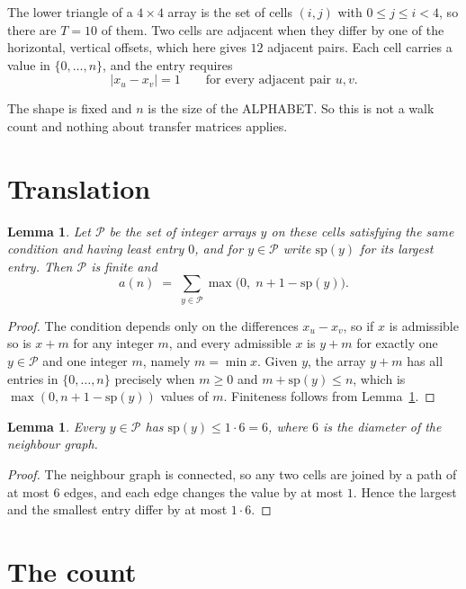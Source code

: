 \documentclass[11pt,a4paper]{article}
\theoremstyle{plain}
\newtheorem{lemma}[theorem]{Lemma}
\theoremstyle{definition}
\begin{document}
The lower triangle of a $4\times4$ array is the set of cells $(i,j)$ with $0\le j\le
i<4$, so there are $T=10$ of them. Two cells are adjacent when they differ by one of the
horizontal, vertical offsets, which here gives $12$ adjacent pairs. Each cell carries a value in
$\{0,\dots,n\}$, and the entry requires
\[
|x_u-x_v|=1\qquad\text{for every adjacent pair }u,v .
\]

The shape is fixed and $n$ is the size of the ALPHABET. So this is not a walk count and
nothing about transfer matrices applies.

\section{Translation}

\begin{lemma}\label{lem:trans}
Let $\mathcal P$ be the set of integer arrays $y$ on these cells satisfying the same condition
and having least entry $0$, and for $y\in\mathcal P$ write $\mathrm{sp}(y)$ for its largest
entry. Then $\mathcal P$ is finite and
\[
a(n)\;=\;\sum_{y\in\mathcal P}\max\bigl(0,\;n+1-\mathrm{sp}(y)\bigr).
\]
\end{lemma}

\begin{proof}
The condition depends only on the differences $x_u-x_v$, so if $x$ is admissible so is $x+m$
for any integer $m$, and every admissible $x$ is $y+m$ for exactly one $y\in\mathcal P$ and one
integer $m$, namely $m=\min x$. Given $y$, the array $y+m$ has all entries in
$\{0,\dots,n\}$ precisely when $m\ge0$ and $m+\mathrm{sp}(y)\le n$, which is
$\max(0,n+1-\mathrm{sp}(y))$ values of $m$. Finiteness follows from
Lemma~\ref{lem:bound}.
\end{proof}

\begin{lemma}\label{lem:bound}
Every $y\in\mathcal P$ has $\mathrm{sp}(y)\le 1\cdot6=6$, where $6$ is the
diameter of the neighbour graph.
\end{lemma}

\begin{proof}
The neighbour graph is connected, so any two cells are joined by a path of at most $6$
edges, and each edge changes the value by at most $1$. Hence the largest and the smallest
entry differ by at most $1\cdot6$.
\end{proof}

\section{The count}
\end{document}
